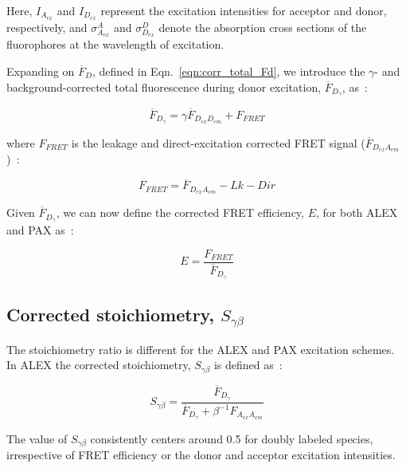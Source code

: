 \noindent
Here, $I_{A_{ex}}$ and $I_{D_{ex}}$ represent the excitation intensities for acceptor and donor, respectively, and $\sigma^{A}_{A_{ex}}$ and $\sigma^{D}_{D_{ex}}$ denote the absorption cross sections of the fluorophores at the wavelength of excitation.

Expanding on $\overline{F}_D$, defined in Eqn.~\ref{eqn:corr_total_Fd}, we introduce the $\gamma$- and background-corrected total fluorescence during donor excitation, $\overline{F}_{D_{\gamma}}$, as~\cite{lee_BPJ_2005, ingargiola_JCP_2018}:

\begin{equation}
    \label{eqn:corr_total_gamma_Fd}
    \overline{F}_{D_{\gamma}} = \gamma\overline{F}_{D_{ex}D_{em}} + F_{FRET}
\end{equation}

\noindent
where $F_{FRET}$ is the leakage and direct-excitation corrected FRET signal ($\overline{F}_{D_{ex}A_{em}}$)~\cite{lee_BPJ_2005, ingargiola_JCP_2018}:

\begin{equation}
    \label{eqn:Ffret}
    F_{FRET} = \overline{F}_{D_{ex}A_{em}} - Lk - Dir
\end{equation}

Given $\overline{F}_{D_{\gamma}}$, we can now define the corrected FRET efficiency, $E$, for both \ac{ALEX} and \ac{PAX} as~\cite{lee_BPJ_2005, ingargiola_JCP_2018}:

\begin{equation}
    \label{eqn:corr_E}
    E = \frac{F_{FRET}}{\overline{F}_{D_{\gamma}}}
\end{equation}

\subsection{Corrected stoichiometry, $S_{\gamma\beta}$}
\label{sec:S_apdx}

The stoichiometry ratio is different for the \ac{ALEX} and \ac{PAX} excitation schemes. 
In \ac{ALEX} the corrected stoichiometry, $S_{\gamma\beta}$ is defined as~\cite{lee_BPJ_2005, ingargiola_JCP_2018}:

\begin{equation}
    \label{eqn:corr_Salex}
    S_{\gamma\beta} = \frac{\overline{F}_{D_{\gamma}}}{\overline{F}_{D_{\gamma}} + \beta^{-1}F_{A_{ex}A_{em}}}
\end{equation}

The value of $S_{\gamma\beta}$ consistently centers around 0.5 for doubly labeled species, irrespective of FRET efficiency or the donor and acceptor excitation intensities.

